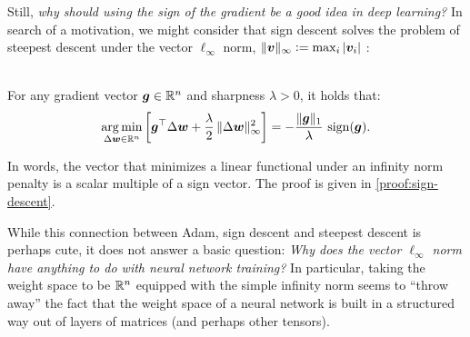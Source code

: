 Still, \textit{why should using the sign of the gradient be a good idea in deep learning?} In search of a motivation, we might consider that sign descent solves the problem of steepest descent under the vector $\ell_\infty$ norm, $\Vert {{\bm{v}}} \Vert_\infty \vcentcolon= \max_i \vert {{\bm{v}}_i} \vert$ \citep{spectral-descent-2, spectral-descent-1, xie2024implicit}:
\begin{myproposition}\label{prop:sign-descent}
    \\For any gradient vector ${\bm{g}}\in\mathbb{R}^n$ and sharpness $\lambda > 0$, it holds that:
    \begin{equation}
        \operatorname*{arg\,min}_{\Delta {\bm{w}} \in \mathbb{R}^n} \left[ {\bm{g}}^\top \Delta {\bm{w}} + \frac{\lambda}{2} \, \Vert {\Delta {\bm{w}}} \Vert_\infty^2 \right] = -\frac{\Vert {{\bm{g}}} \Vert_1}{\lambda} \, \operatorname{sign}({\bm{g}}).
    \end{equation}
\end{myproposition}
In words, the vector that minimizes a linear functional under an infinity norm penalty is a scalar multiple of a sign vector. The proof is given in \cref{proof:sign-descent}. 

While this connection between Adam, sign descent and steepest descent is perhaps cute, it does not answer a basic question: \textit{Why does the vector $\ell_\infty$ norm have anything to do with neural network training?} In particular, taking the weight space to be $\mathbb{R}^n$ equipped with the simple infinity norm seems to ``throw away'' the fact that the weight space of a neural network is built in a structured way out of layers of matrices (and perhaps other tensors).

